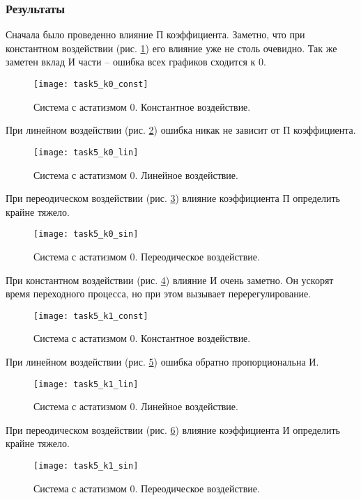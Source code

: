 \documentclass[16pt]{article}
\begin{document}
\subsubsection{Результаты}
Сначала было проведенно влияние П коэффициента.
Заметно, что при константном воздействии (рис. \ref{fig:fig7}) его влияние уже не столь очевидно. Так же заметен вклад И части -- ошибка всех графиков сходится к 0.
\begin{figure}[h!]
    \centering
    \texttt{[image: task5\_k0\_const]}
    \caption{Система с астатизмом 0. Константное воздействие.}
    \label{fig:fig7}
\end{figure}
При линейном воздействии (рис. \ref{fig:fig8}) ошибка никак не зависит от П коэффициента.
\begin{figure}[h!]
    \centering
    \texttt{[image: task5\_k0\_lin]}
    \caption{Система с астатизмом 0. Линейное воздействие.}
    \label{fig:fig8}
\end{figure}

При переодическом воздействии (рис. \ref{fig:fig9}) влияние коэффициента П определить крайне тяжело.
\begin{figure}[h!]
    \centering
    \texttt{[image: task5\_k0\_sin]}
    \caption{Система с астатизмом 0. Переодическое воздействие.}
    \label{fig:fig9}
\end{figure}


При константном воздействии (рис. \ref{fig:fig10}) влияние И очень заметно. Он ускорят время переходного процесса, но при этом вызывает перерегулирование.
\begin{figure}[h!]
    \centering
    \texttt{[image: task5\_k1\_const]}
    \caption{Система с астатизмом 0. Константное воздействие.}
    \label{fig:fig10}
\end{figure}
При линейном воздействии (рис. \ref{fig:fig11}) ошибка обратно пропорциональна И.
\begin{figure}[h!]
    \centering
    \texttt{[image: task5\_k1\_lin]}
    \caption{Система с астатизмом 0. Линейное воздействие.}
    \label{fig:fig11}
\end{figure}

При переодическом воздействии (рис. \ref{fig:fig12}) влияние коэффициента И определить крайне тяжело.
\begin{figure}[h!]
    \centering
    \texttt{[image: task5\_k1\_sin]}
    \caption{Система с астатизмом 0. Переодическое воздействие.}
    \label{fig:fig12}
\end{figure}
\pagebreak
\newpage
\end{document}

